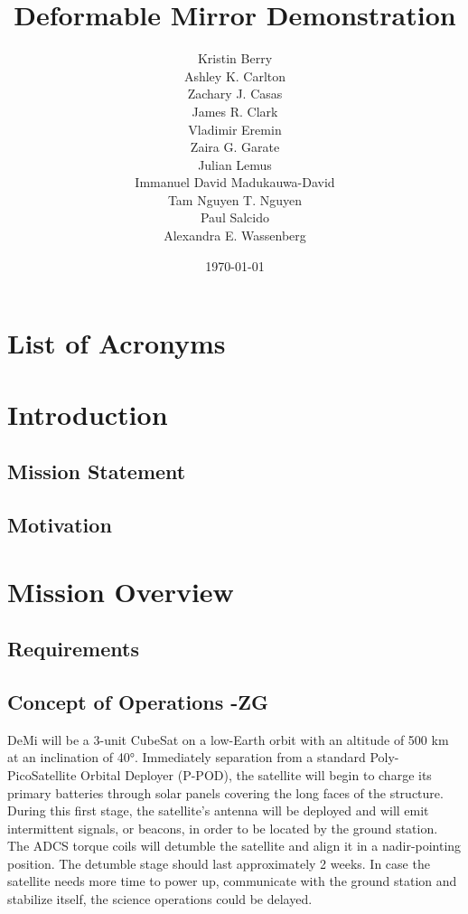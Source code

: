 \documentclass[12pt]{article}
\title{Deformable Mirror Demonstration}
\author{Kristin Berry\\
Ashley K. Carlton\\
Zachary J. Casas\\
James R. Clark\\
Vladimir Eremin\\ 
Zaira G. Garate\\ 
Julian Lemus\\
Immanuel David Madukauwa-David\\
Tam Nguyen T. Nguyen\\
Paul Salcido\\
Alexandra E. Wassenberg 
}
\date{\today}
\begin{document}
\maketitle
\newpage

\tableofcontents
\listoffigures
\listoftables


\section*{List of Acronyms}
\begin{acronym}


\end{acronym}
\newpage

\section{Introduction}
		\subsection{Mission Statement}
		\subsection{Motivation}
\section{Mission Overview}
		\subsection{Requirements}
		\subsection{Concept of Operations -ZG}
		
		DeMi will be a 3-unit CubeSat on a low-Earth orbit with an altitude of 500 km at an inclination of 40°. Immediately separation from a standard Poly-PicoSatellite Orbital Deployer (P-POD), the satellite will begin to charge its primary batteries through solar panels covering the long faces of the structure. During this first stage, the satellite’s antenna will be deployed and will emit intermittent signals, or beacons, in order to be located by the ground station. The ADCS torque coils will detumble the satellite and align it in a nadir-pointing position. The detumble stage should last approximately 2 weeks. In case the satellite needs more time to power up, communicate with the ground station and stabilize itself, the science operations could be delayed. 
		
\end{document}
